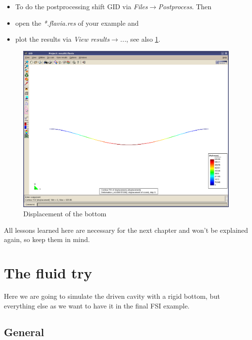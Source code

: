 \begin{itemize}
\item To do the postprocessing shift GID via \emph{Files$\to$Postprocess}.
Then 
\item open the \emph{{*}.flavia.res} of your example and 
\item plot the results via \emph{View results$\to$...}, see also \ref{tut_fsi:3.3}.
\end{itemize}
%
\begin{figure}[h]
\includegraphics[width=1\columnwidth]{Bilder/structure_03}


\caption{\label{tut_fsi:3.3} Displacement of the bottom}
\end{figure}


All lessons learned here are necessary for the next chapter and won't
be explained again, so keep them in mind.


\section{The fluid try}

Here we are going to simulate the driven cavity with a rigid bottom,
but everything else as we want to have it in the final FSI example.


\subsection{General}

